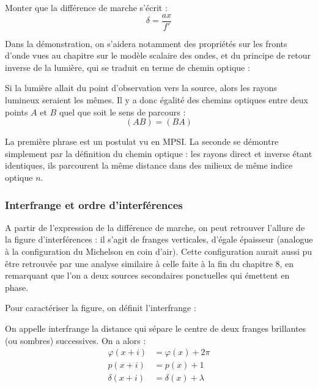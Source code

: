 \documentclass[11pt,fleqn]{book} %
\begin{document}
\begin{capex}
	Monter que la différence de marche s'écrit :
	\begin{equation}
		\delta = \frac{a x}{f'}
	\end{equation}
\end{capex}

Dans la démonstration, on s'aidera notamment des propriétés sur les fronts d'onde vues au chapitre sur le modèle scalaire des ondes, et du principe de retour inverse de la lumière, qui se traduit en terme de chemin optique :
\begin{theorem}
	Si la lumière allait du point d’observation vers la source, alors les rayons lumineux seraient les mêmes.
	Il y a donc égalité des chemins optiques entre deux points $A$ et $B$ quel que soit le sens de parcours :
	\begin{equation}
		(AB) = (BA)
	\end{equation}
\end{theorem}
\begin{demonstration}
	La première phrase est un postulat vu en MPSI. La seconde se démontre simplement par la définition du chemin optique : les rayons direct et inverse étant identiques, ils parcourent la même distance dans des milieux de même indice optique $n$.
\end{demonstration}

\subsubsection{Interfrange et ordre d'interférences}

A partir de l'expression de la différence de marche, on peut retrouver l'allure de la figure d'interférences : il s'agit de franges verticales, d'égale épaisseur (analogue à la configuration du Michelson en coin d'air). Cette configuration aurait aussi pu être retrouvée par une analyse similaire à celle faite à la fin du chapitre 8, en remarquant que l'on a deux sources secondaires ponctuelles qui émettent en phase. 

Pour caractériser la figure, on définit l'interfrange :
\begin{definition}[Interfrange]
	On appelle interfrange la distance qui sépare le centre de deux franges brillantes (ou sombres) successives. On a alors :
	\begin{align}
		\varphi(x + i) &= \varphi(x) + 2 \pi  \\
		p(x+i) &= p(x) + 1 \\
		\delta(x+i) &= \delta(x) + \lambda
	\end{align}
\end{definition}
\end{document}
